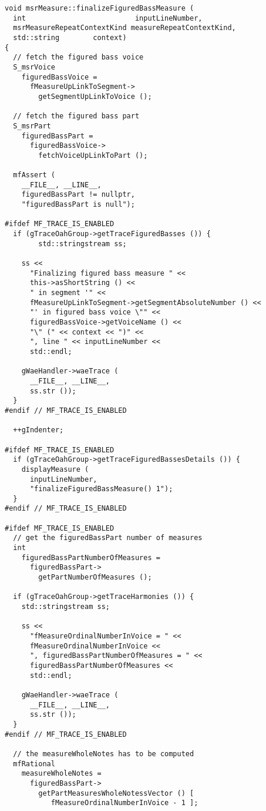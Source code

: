 \begin{lstlisting}[language=CPlusPlus]
void msrMeasure::finalizeFiguredBassMeasure (
  int                          inputLineNumber,
  msrMeasureRepeatContextKind measureRepeatContextKind,
  std::string        context)
{
  // fetch the figured bass voice
  S_msrVoice
    figuredBassVoice =
      fMeasureUpLinkToSegment->
        getSegmentUpLinkToVoice ();

  // fetch the figured bass part
  S_msrPart
    figuredBassPart =
      figuredBassVoice->
        fetchVoiceUpLinkToPart ();

  mfAssert (
    __FILE__, __LINE__,
    figuredBassPart != nullptr,
    "figuredBassPart is null");

#ifdef MF_TRACE_IS_ENABLED
  if (gTraceOahGroup->getTraceFiguredBasses ()) {
		std::stringstream ss;

    ss <<
      "Finalizing figured bass measure " <<
      this->asShortString () <<
      " in segment '" <<
      fMeasureUpLinkToSegment->getSegmentAbsoluteNumber () <<
      "' in figured bass voice \"" <<
      figuredBassVoice->getVoiceName () <<
      "\" (" << context << ")" <<
      ", line " << inputLineNumber <<
      std::endl;

    gWaeHandler->waeTrace (
      __FILE__, __LINE__,
      ss.str ());
  }
#endif // MF_TRACE_IS_ENABLED

  ++gIndenter;

#ifdef MF_TRACE_IS_ENABLED
  if (gTraceOahGroup->getTraceFiguredBassesDetails ()) {
    displayMeasure (
      inputLineNumber,
      "finalizeFiguredBassMeasure() 1");
  }
#endif // MF_TRACE_IS_ENABLED

#ifdef MF_TRACE_IS_ENABLED
  // get the figuredBassPart number of measures
  int
    figuredBassPartNumberOfMeasures =
      figuredBassPart->
        getPartNumberOfMeasures ();

  if (gTraceOahGroup->getTraceHarmonies ()) {
    std::stringstream ss;

    ss <<
      "fMeasureOrdinalNumberInVoice = " <<
      fMeasureOrdinalNumberInVoice <<
      ", figuredBassPartNumberOfMeasures = " <<
      figuredBassPartNumberOfMeasures <<
      std::endl;

    gWaeHandler->waeTrace (
      __FILE__, __LINE__,
      ss.str ());
  }
#endif // MF_TRACE_IS_ENABLED

  // the measureWholeNotes has to be computed
  mfRational
    measureWholeNotes =
      figuredBassPart->
        getPartMeasuresWholeNotessVector () [
           fMeasureOrdinalNumberInVoice - 1 ];


\end{lstlisting}
